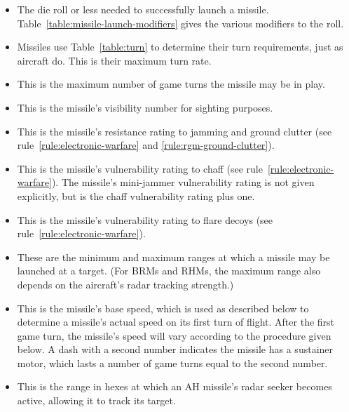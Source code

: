 {\begin{itemize}
    \item {} The die roll or less needed to successfully launch a missile. Table~\ref{table:missile-launch-modifiers} gives the various modifiers to the roll.

    \item {} Missiles use Table~\ref{table:turn} to determine their turn requirements, just as aircraft do. This is their maximum turn rate.

    \item {} This is the maximum number of game turns the missile may be in play.

    \item {} This is the missile’s visibility number for sighting purposes.

    \item {} This is the missile’s resistance rating to jamming and ground clutter (see rule~\ref{rule:electronic-warfare} and \ref{rule:rgm-ground-clutter}).

    \item {} This is the missile’s vulnerability rating to chaff (see rule~\ref{rule:electronic-warfare}). The missile’s mini-jammer vulnerability rating is not given explicitly, but is the chaff vulnerability rating plus one.

    \item {} This is the missile’s vulnerability rating to flare decoys (see rule~\ref{rule:electronic-warfare}).

    \item {} These are the minimum and maximum ranges at which a missile may be launched at a target. (For BRMs and RHMs, the maximum range also depends on the aircraft’s radar tracking strength.)

    \item {} This is the missile’s base speed, which is used as described below to determine a missile’s actual speed on its first turn of flight. After the first game turn, the missile’s speed will vary according to the procedure given below. A dash with a second number indicates the missile has a sustainer motor, which lasts a number of game turns equal to the second number.

    \item {} This is the range in hexes at which an AH missile’s radar seeker becomes active, allowing it to track its target.


\end{itemize}}
